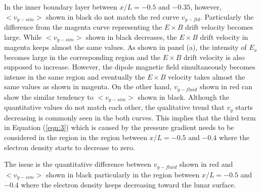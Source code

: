 \documentclass[draft,jgrga]{agutex2015}
\begin{document}
\begin{article}
In the inner boundary layer between $x/L=-0.5$ and $-0.35$, 
however, 
$<v_{y-sim}>$ shown in black do not match the red curve
$v_{y-fld}$.
%
%
Particularly the difference from the magenta curve representing 
the $E \times B$ drift velocity becomes large.
While $<v_{y-sim}>$ shown in black decreases,
the $E \times B$ drift velocity in magenta keeps almost the same values. 
As shown in panel (a), the intensity of $E_x$ becomes large 
in the corresponding region and the $E \times B$ drift velocity 
is also supposed to increase. 
However, the dipole magnetic field simultaneously becomes intense 
in the same region and eventually the $E \times B$ velocity 
takes almost the same values as shown in magenta.
On the other hand, 
$v_{y-fluid}$ shown in red can show the similar tendency to 
$<v_{y-sim}>$ shown in black.
Although the quantitative values do not match each other,
the qualitative trend that 
$v_y$ starts decreasing 
is commonly seen in the both curves.
This implies that the third term in Equation (\ref{eqn:3})
which is caused by the
pressure gradient needs to be considered in the region 
in the region between $x/L =-0.5$ and $-0.4$ 
where the electron density starts to decrease to zero. 


The issue is the quantitative difference between 
$v_{y-fluid}$ shown in red and $<v_{y-sim}>$ shown in black
particularly in the region between $x/L =-0.5$ and $-0.4$ 
where the electron density keeps decreasing toward the lunar surface.


\end{article}
\end{document}
